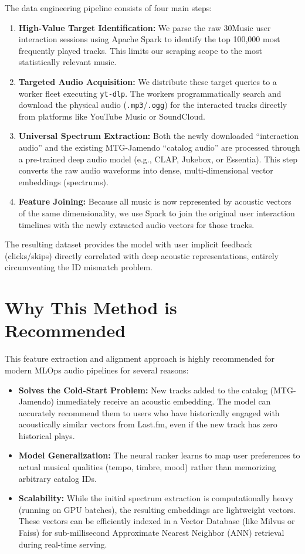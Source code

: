 \documentclass[12pt, letterpaper]{article}
\begin{document}
The data engineering pipeline consists of four main steps:
\begin{enumerate}[label=\textbf{Step \arabic*:}, leftmargin=*]
    \item \textbf{High-Value Target Identification:} We parse the raw 30Music user interaction sessions using Apache Spark to identify the top 100,000 most frequently played tracks. This limits our scraping scope to the most statistically relevant music.
    \item \textbf{Targeted Audio Acquisition:} We distribute these target queries to a worker fleet executing \texttt{yt-dlp}. The workers programmatically search and download the physical audio (\texttt{.mp3}/\texttt{.ogg}) for the interacted tracks directly from platforms like YouTube Music or SoundCloud.
    \item \textbf{Universal Spectrum Extraction:} Both the newly downloaded ``interaction audio'' and the existing MTG-Jamendo ``catalog audio'' are processed through a pre-trained deep audio model (e.g., CLAP, Jukebox, or Essentia). This step converts the raw audio waveforms into dense, multi-dimensional vector embeddings (spectrums).
    \item \textbf{Feature Joining:} Because all music is now represented by acoustic vectors of the same dimensionality, we use Spark to join the original user interaction timelines with the newly extracted audio vectors for those tracks. 
\end{enumerate}
The resulting dataset provides the model with user implicit feedback (clicks/skips) directly correlated with deep acoustic representations, entirely circumventing the ID mismatch problem.

\section{Why This Method is Recommended}
This feature extraction and alignment approach is highly recommended for modern MLOps audio pipelines for several reasons:
\begin{itemize}
    \item \textbf{Solves the Cold-Start Problem:} New tracks added to the catalog (MTG-Jamendo) immediately receive an acoustic embedding. The model can accurately recommend them to users who have historically engaged with acoustically similar vectors from Last.fm, even if the new track has zero historical plays.
    \item \textbf{Model Generalization:} The neural ranker learns to map user preferences to actual musical qualities (tempo, timbre, mood) rather than memorizing arbitrary catalog IDs.
    \item \textbf{Scalability:} While the initial spectrum extraction is computationally heavy (running on GPU batches), the resulting embeddings are lightweight vectors. These vectors can be efficiently indexed in a Vector Database (like Milvus or Faiss) for sub-millisecond Approximate Nearest Neighbor (ANN) retrieval during real-time serving.
\end{itemize}
\end{document}
